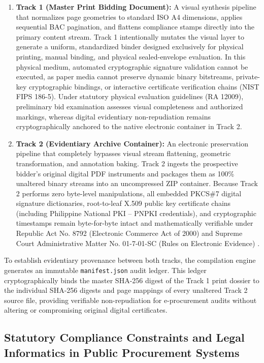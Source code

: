 \begin{enumerate}
    \item \textbf{Track 1 (Master Print Bidding Document):} A visual synthesis pipeline that normalizes page geometries to standard ISO A4 dimensions, applies sequential BAC pagination, and flattens compliance stamps directly into the primary content stream.
    Track 1 intentionally mutates the visual layer to generate a uniform, standardized binder designed exclusively for physical printing, manual binding, and physical sealed-envelope evaluation.
    In this physical medium, automated cryptographic signature validation cannot be executed, as paper media cannot preserve dynamic binary bitstreams, private-key cryptographic bindings, or interactive certificate verification chains (NIST FIPS 186-5).
    Under statutory physical evaluation guidelines (RA 12009), preliminary bid examination assesses visual completeness and authorized markings, whereas digital evidentiary non-repudiation remains cryptographically anchored to the native electronic container in Track 2.
    \item \textbf{Track 2 (Evidentiary Archive Container):} An electronic preservation pipeline that completely bypasses visual stream flattening, geometric transformation, and annotation baking.
    Track 2 ingests the prospective bidder's original digital PDF instruments and packages them as 100\% unaltered binary streams into an uncompressed ZIP container.
    Because Track 2 performs zero byte-level manipulations, all embedded PKCS\#7 digital signature dictionaries, root-to-leaf X.509 public key certificate chains (including Philippine National PKI -- PNPKI credentials), and cryptographic timestamps remain byte-for-byte intact and mathematically verifiable under Republic Act No. 8792 (Electronic Commerce Act of 2000) and Supreme Court Administrative Matter No. 01-7-01-SC (Rules on Electronic Evidence) \cite{ref10, ref11}.
\end{enumerate}

To establish evidentiary provenance between both tracks, the compilation engine generates an immutable \texttt{manifest.json} audit ledger.
This ledger cryptographically binds the master SHA-256 digest of the Track 1 print dossier to the individual SHA-256 digests and page mappings of every unaltered Track 2 source file, providing verifiable non-repudiation for e-procurement audits without altering or compromising original digital certificates.

\subsection{Statutory Compliance Constraints and Legal Informatics in Public Procurement Systems}

